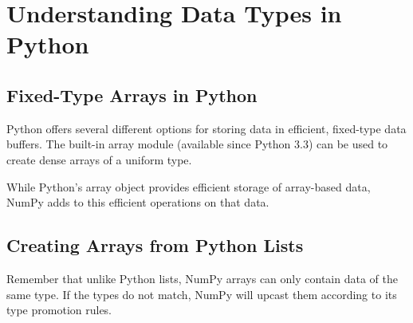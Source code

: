 \chapter{Understanding Data Types in Python}
\section{Fixed-Type Arrays in Python}
Python offers several different options for storing data in efficient, fixed-type data buffers. The built-in array module (available since Python 3.3) can be used to create dense arrays of a uniform type.

While Python's array object provides efficient storage of array-based data, NumPy adds to this efficient operations on that data.
\section{Creating Arrays from Python Lists}

Remember that unlike Python lists, NumPy arrays can only contain data of the same type. If the types do not match, NumPy will upcast them according to its type promotion rules.